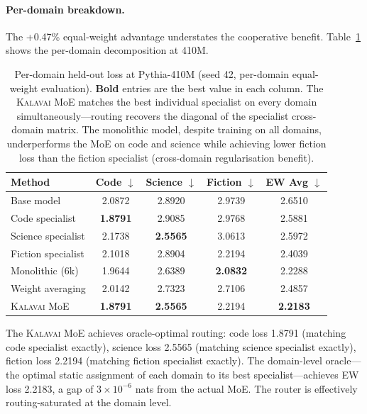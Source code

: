 \documentclass{article}
\newcommand{\kalavai}{\textsc{Kalavai}\xspace}
\begin{document}
\paragraph{Per-domain breakdown.} The +0.47\% equal-weight advantage understates the cooperative benefit. Table~\ref{tab:perdomain} shows the per-domain decomposition at 410M.

\begin{table}[h]
\centering
\caption{Per-domain held-out loss at Pythia-410M (seed 42, per-domain equal-weight evaluation). \textbf{Bold} entries are the best value in each column. The \kalavai MoE matches the best individual specialist on every domain simultaneously---routing recovers the diagonal of the specialist cross-domain matrix. The monolithic model, despite training on all domains, underperforms the MoE on code and science while achieving lower fiction loss than the fiction specialist (cross-domain regularisation benefit).}
\label{tab:perdomain}
\small
\begin{tabular}{lcccc}
\toprule
\textbf{Method} & \textbf{Code} $\downarrow$ & \textbf{Science} $\downarrow$ & \textbf{Fiction} $\downarrow$ & \textbf{EW Avg} $\downarrow$ \\
\midrule
Base model          & 2.0872 & 2.8920 & 2.9739 & 2.6510 \\
Code specialist     & \textbf{1.8791} & 2.9085 & 2.9768 & 2.5881 \\
Science specialist  & 2.1738 & \textbf{2.5565} & 3.0613 & 2.5972 \\
Fiction specialist  & 2.1018 & 2.8904 & 2.2194 & 2.4039 \\
\midrule
Monolithic (6k)     & 1.9644 & 2.6389 & \textbf{2.0832} & 2.2288 \\
Weight averaging    & 2.0142 & 2.7323 & 2.7106 & 2.4857 \\
\kalavai MoE        & \textbf{1.8791} & \textbf{2.5565} & 2.2194 & \textbf{2.2183} \\
\bottomrule
\end{tabular}
\end{table}

The \kalavai MoE achieves oracle-optimal routing: code loss 1.8791 (matching code specialist exactly), science loss 2.5565 (matching science specialist exactly), fiction loss 2.2194 (matching fiction specialist exactly). The domain-level oracle---the optimal static assignment of each domain to its best specialist---achieves EW loss 2.2183, a gap of $3 \times 10^{-6}$ nats from the actual MoE. The router is effectively routing-saturated at the domain level.
\end{document}
